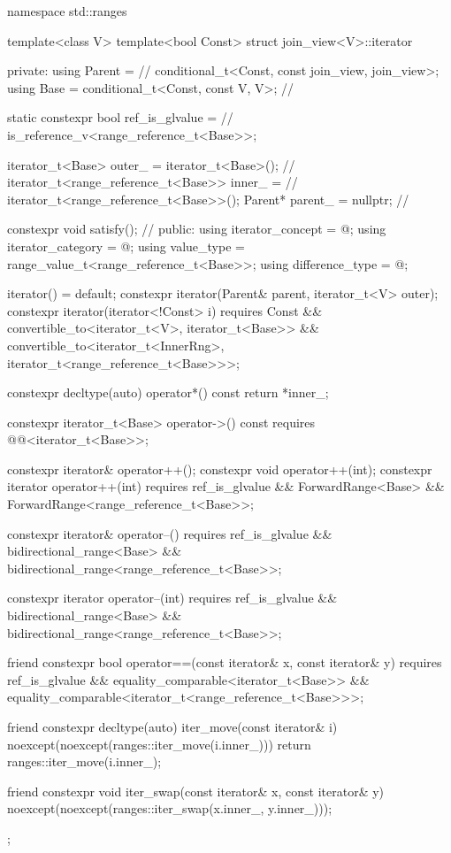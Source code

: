 \pnum
\begin{codeblock}
namespace std::ranges {
template<class V>
  template<bool Const>
  struct join_view<V>::iterator {
  private:
    using Parent =                                              // \expos
      conditional_t<Const, const join_view, join_view>;
    using Base   = conditional_t<Const, const V, V>;            // \expos

    static constexpr bool ref_is_glvalue =                      // \expos
      is_reference_v<range_reference_t<Base>>;

    iterator_t<Base> outer_ = iterator_t<Base>();               // \expos
    iterator_t<range_reference_t<Base>> inner_ =                // \expos
      iterator_t<range_reference_t<Base>>();
    Parent* parent_ = nullptr;                                  // \expos

    constexpr void satisfy();                                   // \expos
  public:
    using iterator_concept  = @\seebelow@;
    using iterator_category = @\seebelow@;
    using value_type        = range_value_t<range_reference_t<Base>>;
    using difference_type   = @\seebelow@;

    iterator() = default;
    constexpr iterator(Parent& parent, iterator_t<V> outer);
    constexpr iterator(iterator<!Const> i)
      requires Const &&
               convertible_to<iterator_t<V>, iterator_t<Base>> &&
               convertible_to<iterator_t<InnerRng>,
                              iterator_t<range_reference_t<Base>>>;

    constexpr decltype(auto) operator*() const { return *inner_; }

    constexpr iterator_t<Base> operator->() const
      requires @@<iterator_t<Base>>;

    constexpr iterator& operator++();
    constexpr void operator++(int);
    constexpr iterator operator++(int)
      requires ref_is_glvalue && ForwardRange<Base> &&
               ForwardRange<range_reference_t<Base>>;

    constexpr iterator& operator--()
      requires ref_is_glvalue && bidirectional_range<Base> &&
               bidirectional_range<range_reference_t<Base>>;

    constexpr iterator operator--(int)
      requires ref_is_glvalue && bidirectional_range<Base> &&
               bidirectional_range<range_reference_t<Base>>;

    friend constexpr bool operator==(const iterator& x, const iterator& y)
      requires ref_is_glvalue && equality_comparable<iterator_t<Base>> &&
               equality_comparable<iterator_t<range_reference_t<Base>>>;

    friend constexpr decltype(auto) iter_move(const iterator& i)
    noexcept(noexcept(ranges::iter_move(i.inner_))) {
      return ranges::iter_move(i.inner_);
    }

    friend constexpr void iter_swap(const iterator& x, const iterator& y)
      noexcept(noexcept(ranges::iter_swap(x.inner_, y.inner_)));
  };
}
\end{codeblock}

